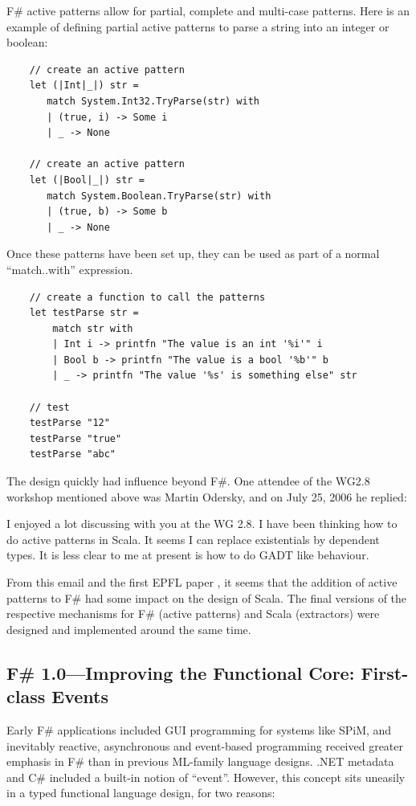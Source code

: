 \documentclass[acmsmall,screen]{acmart}
\begin{document}
F\# active patterns allow for partial, complete and multi-case patterns. Here is an example of defining partial active patterns to parse a string into an integer or boolean:

\begin{verbatim}
    // create an active pattern
    let (|Int|_|) str =
       match System.Int32.TryParse(str) with
       | (true, i) -> Some i
       | _ -> None

    // create an active pattern
    let (|Bool|_|) str =
       match System.Boolean.TryParse(str) with
       | (true, b) -> Some b
       | _ -> None
\end{verbatim}
Once these patterns have been set up, they can be used as part of a normal “match..with” expression.

\begin{verbatim}
    // create a function to call the patterns
    let testParse str = 
        match str with
        | Int i -> printfn "The value is an int '%i'" i
        | Bool b -> printfn "The value is a bool '%b'" b
        | _ -> printfn "The value '%s' is something else" str

    // test
    testParse "12"
    testParse "true"
    testParse "abc"
\end{verbatim}

The design quickly had influence beyond F\#. One attendee of the WG2.8 workshop mentioned above was Martin Odersky, and on July 25, 2006 he replied:

\begin{verbquote}
I enjoyed a lot discussing with you at the WG 2.8. I have been thinking how to do active patterns in Scala. It seems I can replace existentials by dependent types. It is less clear to me at present is how to do GADT like behaviour. 
\end{verbquote}


From this email and the first EPFL paper \citep{Emir2007}, it seems that the addition of active patterns to F\# had some impact on the design of Scala. The final versions of the respective mechanisms for F\# (active patterns) and Scala (extractors) were designed and implemented around the same time.    


\subsection*{F\# 1.0---Improving the Functional Core: First-class Events}

Early F\# applications included GUI programming for systems like SPiM, and inevitably reactive, asynchronous and event-based programming received greater emphasis in F\# than in previous ML-family language designs. .NET metadata and C\# included a built-in notion of “event”. However, this concept sits uneasily in a typed functional language design, for two reasons:
\end{document}
